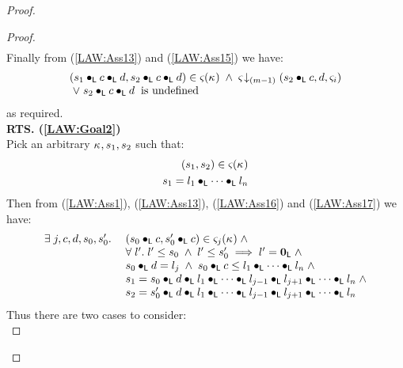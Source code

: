 \begin{lemma}[]
\begin{proof}
\begin{proof}
\begin{align}
\end{align}
Finally from (\ref{LAW:Ass13}) and (\ref{LAW:Ass15}) we have:
%
\begin{align}
\begin{array}{l}
	(s_1 \bullet_{\textsf{L}} c \bullet_{\textsf{L}} d, s_2 \bullet_{\textsf{L}} c \bullet_{\textsf{L}} d) \in \varsigma_{}(\kappa_{}) \;\land\; \varsigma_{} \!\downarrow_{(m-1)} \left(s_2 \bullet_{\textsf{L}} c, d, \varsigma_{i}\right)\\
	\;\lor\; s_2 \bullet_{\textsf{L}} c \bullet_{\textsf{L}} d \hspace*{0.2cm} \text{is undefined}
\end{array} \nonumber
\end{align}
as required.\\

\noindent\textbf{RTS. (\ref{LAW:Goal2})}\\
Pick an arbitrary $\kappa_{}, s_1, s_2$ such that:
%
\begin{align}
	(s_1, s_2) \in \varsigma_{}(\kappa_{}) \label{LAW:Ass16}\\
	s_1 = l_1 \bullet_{\textsf{L}} \cdots \bullet_{\textsf{L}} l_n \label{LAW:Ass17}
\end{align}
Then from (\ref{LAW:Ass1}), (\ref{LAW:Ass13}), (\ref{LAW:Ass16}) and (\ref{LAW:Ass17}) we have:
%
\begin{align}
	\begin{array}{l l}
		\exists\; j, c, d, s_0, s'_0.\; & 
		(s_0 \bullet_{\textsf{L}} c, s'_0 \bullet_{\textsf{L}} c) \in \varsigma_{j}(\kappa_{}) \;\land\\
		&\forall\; l'.\; l' \leq s_0 \;\land\; l' \leq s'_0 \implies l' = \mathbf{0}_{\textsf{L}}  \;\land\\
		&s_0 \bullet_{\textsf{L}} d = l_j \;\land\; s_0 \bullet_{\textsf{L}} c \leq l_1 \bullet_{\textsf{L}} \cdots \bullet_{\textsf{L}} l_n  \;\land\\
		&s_1 = s_0 \bullet_{\textsf{L}} d \bullet_{\textsf{L}} l_1 \bullet_{\textsf{L}} \cdots \bullet_{\textsf{L}} l_{j-1} \bullet_{\textsf{L}} l_{j+1} \bullet_{\textsf{L}} \cdots \bullet_{\textsf{L}} l_n  \;\land\\
		&s_2 = s'_0 \bullet_{\textsf{L}} d \bullet_{\textsf{L}} l_1 \bullet_{\textsf{L}} \cdots \bullet_{\textsf{L}} l_{j-1} \bullet_{\textsf{L}} l_{j+1} \bullet_{\textsf{L}} \cdots \bullet_{\textsf{L}} l_n
	\end{array} \label{LAW:Ass18}
\end{align}
Thus there are two cases to consider:\\


\end{proof}
\end{proof}
\end{lemma}
